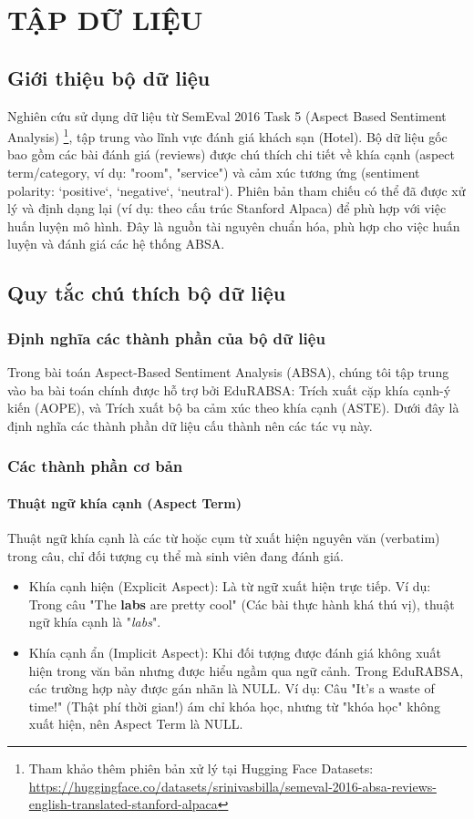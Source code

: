 \documentclass[12pt,a4paper]{report}
\begin{document}
\chapter{TẬP DỮ LIỆU}
\section{Giới thiệu bộ dữ liệu}
Nghiên cứu sử dụng dữ liệu từ SemEval 2016 Task 5 (Aspect Based Sentiment Analysis) \footnote{Tham khảo thêm phiên bản xử lý tại Hugging Face Datasets: \url{https://huggingface.co/datasets/srinivasbilla/semeval-2016-absa-reviews-english-translated-stanford-alpaca}}, tập trung vào lĩnh vực đánh giá khách sạn (Hotel). Bộ dữ liệu gốc bao gồm các bài đánh giá (reviews) được chú thích chi tiết về khía cạnh (aspect term/category, ví dụ: "room", "service") và cảm xúc tương ứng (sentiment polarity: `positive`, `negative`, `neutral`). Phiên bản tham chiếu có thể đã được xử lý và định dạng lại (ví dụ: theo cấu trúc Stanford Alpaca) để phù hợp với việc huấn luyện mô hình. Đây là nguồn tài nguyên chuẩn hóa, phù hợp cho việc huấn luyện và đánh giá các hệ thống ABSA.


\section{Quy tắc chú thích bộ dữ liệu}
\subsection{Định nghĩa các thành phần của bộ dữ liệu}
Trong bài toán Aspect-Based Sentiment Analysis (ABSA), chúng tôi tập trung vào ba bài toán chính được hỗ trợ bởi EduRABSA: Trích xuất cặp khía cạnh-ý kiến (AOPE), và Trích xuất bộ ba cảm xúc theo khía cạnh (ASTE). Dưới đây là định nghĩa các thành phần dữ liệu cấu thành nên các tác vụ này.

\subsection{Các thành phần cơ bản}

\subsubsection{Thuật ngữ khía cạnh (Aspect Term)} Thuật ngữ khía cạnh là các từ hoặc cụm từ xuất hiện nguyên văn (verbatim) trong câu, chỉ đối tượng cụ thể mà sinh viên đang đánh giá. \begin{itemize} \item Khía cạnh hiện (Explicit Aspect): Là từ ngữ xuất hiện trực tiếp. Ví dụ: Trong câu "The \textbf{labs} are pretty cool" (Các bài thực hành khá thú vị), thuật ngữ khía cạnh là "\textit{labs}". \item Khía cạnh ẩn (Implicit Aspect): Khi đối tượng được đánh giá không xuất hiện trong văn bản nhưng được hiểu ngầm qua ngữ cảnh. Trong EduRABSA, các trường hợp này được gán nhãn là NULL. Ví dụ: Câu "It's a waste of time!" (Thật phí thời gian!) ám chỉ khóa học, nhưng từ "khóa học" không xuất hiện, nên Aspect Term là NULL. \end{itemize}
\end{document}
